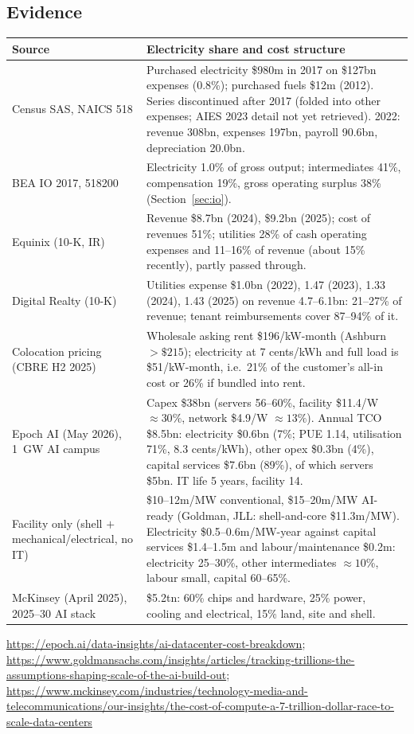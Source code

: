 \documentclass[11pt]{article}
\begin{document}
\subsection{Evidence}
\begin{center}\small
\begin{tabular}{p{4.2cm}p{9.8cm}}
\toprule
Source & Electricity share and cost structure \\
\midrule
Census SAS, NAICS 518 & Purchased electricity \$980m in 2017 on \$127bn expenses (0.8\%); purchased fuels \$12m (2012). Series discontinued after 2017 (folded into other expenses; AIES 2023 detail not yet retrieved). 2022: revenue 308bn, expenses 197bn, payroll 90.6bn, depreciation 20.0bn. \\
BEA IO 2017, 518200 & Electricity 1.0\% of gross output; intermediates 41\%, compensation 19\%, gross operating surplus 38\% (Section~\ref{sec:io}). \\
Equinix (10-K, IR) & Revenue \$8.7bn (2024), \$9.2bn (2025); cost of revenues 51\%; utilities 28\% of cash operating expenses and 11--16\% of revenue (about 15\% recently), partly passed through. \\
Digital Realty (10-K) & Utilities expense \$1.0bn (2022), 1.47 (2023), 1.33 (2024), 1.43 (2025) on revenue 4.7--6.1bn: 21--27\% of revenue; tenant reimbursements cover 87--94\% of it. \\
Colocation pricing (CBRE H2 2025) & Wholesale asking rent \$196/kW-month (Ashburn $>\$215$); electricity at 7 cents/kWh and full load is \$51/kW-month, i.e.\ 21\% of the customer's all-in cost or 26\% if bundled into rent. \\
Epoch AI (May 2026), 1~GW AI campus & Capex \$38bn (servers 56--60\%, facility \$11.4/W $\approx 30\%$, network \$4.9/W $\approx 13\%$). Annual TCO \$8.5bn: electricity \$0.6bn (7\%; PUE 1.14, utilisation 71\%, 8.3 cents/kWh), other opex \$0.3bn (4\%), capital services \$7.6bn (89\%), of which servers \$5bn. IT life 5 years, facility 14. \\
Facility only (shell $+$ mechanical/electrical, no IT) & \$10--12m/MW conventional, \$15--20m/MW AI-ready (Goldman, JLL: shell-and-core \$11.3m/MW). Electricity \$0.5--0.6m/MW-year against capital services \$1.4--1.5m and labour/maintenance \$0.2m: electricity 25--30\%, other intermediates $\approx 10$\%, labour small, capital 60--65\%. \\
McKinsey (April 2025), 2025--30 AI stack & \$5.2tn: 60\% chips and hardware, 25\% power, cooling and electrical, 15\% land, site and shell. \\
\bottomrule
\end{tabular}
\end{center}
\url{https://epoch.ai/data-insights/ai-datacenter-cost-breakdown}; \url{https://www.goldmansachs.com/insights/articles/tracking-trillions-the-assumptions-shaping-scale-of-the-ai-build-out}; \url{https://www.mckinsey.com/industries/technology-media-and-telecommunications/our-insights/the-cost-of-compute-a-7-trillion-dollar-race-to-scale-data-centers}
\end{document}
